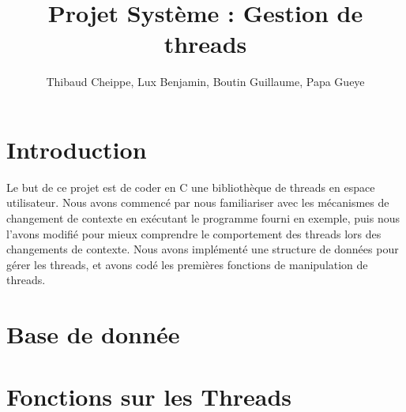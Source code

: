 \documentclass[a4paper,11pt]{report}
\title{Projet Système : Gestion de threads}
\author{Thibaud Cheippe, Lux Benjamin, Boutin Guillaume, Papa Gueye}
\begin{document}
\maketitle



\section*{Introduction}

Le but de ce projet est de coder en C une bibliothèque de threads en espace utilisateur. Nous avons commencé par nous familiariser avec les mécanismes de changement de contexte en exécutant le programme fourni en exemple, puis nous l'avons modifié pour mieux comprendre le comportement des threads lors des changements de contexte. Nous avons implémenté une structure de données pour gérer les threads, et avons codé les premières fonctions de manipulation de threads.

\section{Base de donnée} 


\section{Fonctions sur les Threads}

\end{document}
